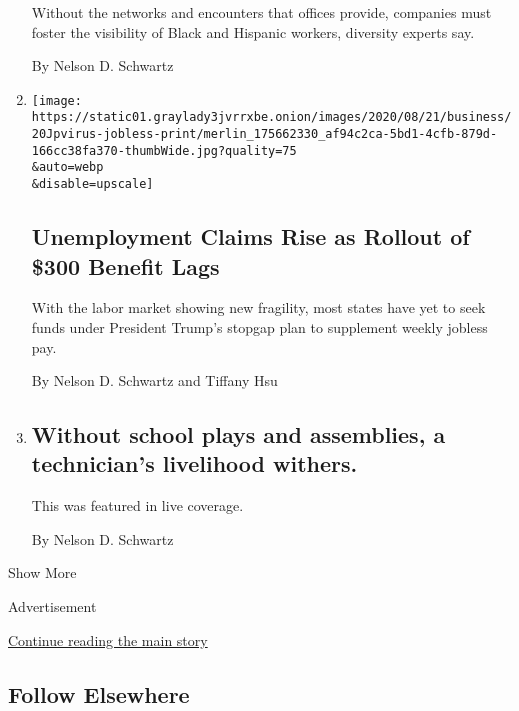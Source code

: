 \begin{enumerate}
  Without the networks and encounters that offices provide, companies
  must foster the visibility of Black and Hispanic workers, diversity
  experts say.

  By Nelson D. Schwartz
\item
  \href{/2020/08/20/business/economy/unemployment-claims.html}{}

  \texttt{[image: https://static01.graylady3jvrrxbe.onion/images/2020/08/21/business/20Jpvirus-jobless-print/merlin\_175662330\_af94c2ca-5bd1-4cfb-879d-166cc38fa370-thumbWide.jpg?quality=75\\\&auto=webp\\\&disable=upscale]}

  \hypertarget{unemployment-claims-rise-as-rollout-of-300-benefit-lags}{%
  \subsection{Unemployment Claims Rise as Rollout of \$300 Benefit
  Lags}\label{unemployment-claims-rise-as-rollout-of-300-benefit-lags}}

  With the labor market showing new fragility, most states have yet to
  seek funds under President Trump's stopgap plan to supplement weekly
  jobless pay.

  By Nelson D. Schwartz and Tiffany Hsu
\item
  \href{/live/2020/08/20/business/stock-market-today-coronavirus/without-school-plays-and-assemblies-a-technicians-livelihood-withers}{}

  \hypertarget{without-school-plays-and-assemblies-a-technicians-livelihood-withers}{%
  \subsection{Without school plays and assemblies, a technician's
  livelihood
  withers.}\label{without-school-plays-and-assemblies-a-technicians-livelihood-withers}}

  This was featured in live coverage.

  By Nelson D. Schwartz
\end{enumerate}

Show More

Advertisement

\protect\hyperlink{after-mid2}{Continue reading the main story}

\hypertarget{follow-elsewhere}{%
\subsection{Follow Elsewhere}\label{follow-elsewhere}}

